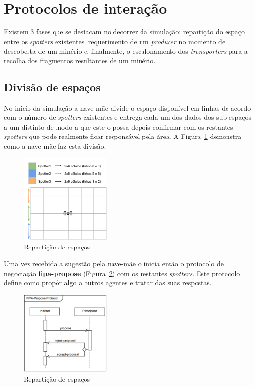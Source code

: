 \documentclass[12pt]{report}
\begin{document}
\section{Protocolos de interação}

Existem 3 fases que se destacam no decorrer da simulação: repartição do espaço entre os \emph{spotters} existentes, requerimento de um \emph{producer} no momento de descoberta de um minério e, finalmente,
o escalonamento dos \emph{transporters} para a recolha dos fragmentos resultantes de um minério.


\subsection{Divisão de espaços}
No inicio da simulação a nave-mãe divide o espaço disponível em linhas de acordo com o número de \emph{spotters} existentes e entrega cada um dos dados dos sub-espaços a um \spotter distinto de modo a que
este o possa depois confirmar com os restantes \emph{spotters} que pode realmente ficar responsável pela área. A Figura~\ref{space-sharing} demonstra como a nave-mãe faz esta divisão.

\begin{figure}[h]
	\centering
	\includegraphics[width=0.4\textwidth]{space-sharing}
	\caption{Repartição de espaços}
	\label{space-sharing}
\end{figure}

Uma vez recebida a sugestão pela nave-mãe o \spotter inicia então o protocolo de negociação \textbf{fipa-propose} (Figura~\ref{fipa-propose}) com os restantes \emph{spotters}. Este protocolo define como propôr algo a outros agentes e
tratar das suas respostas.

\begin{figure}[h]
	\centering
	\includegraphics[width=0.4\textwidth]{fipa-propose}
	\caption{Repartição de espaços}
	\label{fipa-propose}
\end{figure}
\end{document}
